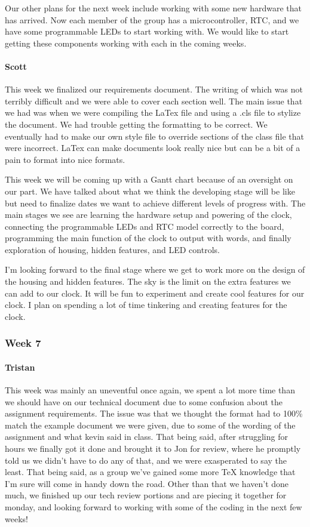 \documentclass[onecolumn, draftclsnofoot,10pt, compsoc]{IEEEtran}
\begin{document}
Our other plans for the next week include working with some new hardware that has arrived. Now each member of the group has a microcontroller, RTC, and we have some programmable LEDs to start working with. We would like to start getting these components working with each in the coming weeks.
\paragraph{Scott}
This week we finalized our requirements document. The writing of which was not terribly difficult and we were able to cover each section well. The main issue that we had was when we were compiling the LaTex file and using a .cls file to stylize the document. We had trouble getting the formatting to be correct. We eventually had to make our own style file to override sections of the class file that were incorrect. LaTex can make documents look really nice but can be a bit of a pain to format into nice formats.

This week we will be coming up with a Gantt chart because of an oversight on our part. We have talked about what we think the developing stage will be like but need to finalize dates we want to achieve different levels of progress with. The main stages we see are learning the hardware setup and powering of the clock, connecting the programmable LEDs and RTC model correctly to the board, programming the main function of the clock to output with words, and finally exploration of housing, hidden features, and LED controls.

I'm looking forward to the final stage where we get to work more on the design of the housing and hidden features. The sky is the limit on the extra features we can add to our clock. It will be fun to experiment and create cool features for our clock. I plan on spending a lot of time tinkering and creating features for the clock.
\subsubsection{Week 7}
\paragraph{Tristan}
This week was mainly an uneventful once again, we spent a lot more time than we should have on our technical document due to some confusion about the assignment requirements. The issue was that we thought the format had to 100\% match the example document we were given, due to some of the wording of the assignment and what kevin said in class. That being said, after struggling for hours we finally got it done and brought it to Jon for review, where he promptly told us we didn't have to do any of that, and we were exasperated to say the least. That being said, as a group we've gained some more TeX knowledge that I'm sure will come in handy down the road. Other than that we haven't done much, we finished up our tech review portions and are piecing it together for monday, and looking forward to working with some of the coding in the next few weeks!
\end{document}
